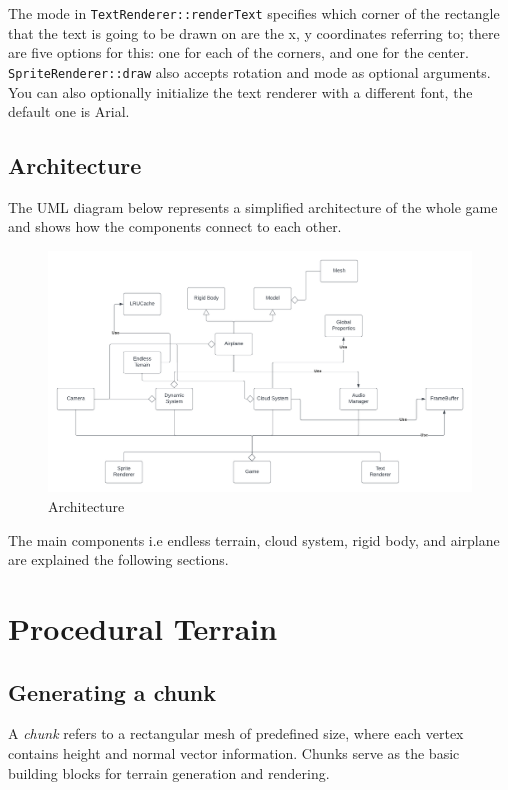 The mode in \texttt{TextRenderer::renderText} specifies which corner of the rectangle that the text is going to be drawn on are the x, y coordinates referring to; there are five options for this: one for each of the corners, and one for the center. \texttt{SpriteRenderer::draw} also accepts rotation and mode as optional arguments. You can also optionally initialize the text renderer with a different font, the default one is Arial.


\subsection{Architecture}

The UML diagram below represents a simplified architecture of the whole game and shows how the components connect to each other.

\begin{figure}[H]
    \centering
    \includegraphics[width=1.0\textwidth]{images/architecture.png}
    \caption{Architecture}
    \label{fig:architecture}
\end{figure}


The main components i.e endless terrain, cloud system, rigid body, and airplane are explained the following sections.

\section{Procedural Terrain}

\subsection{Generating a chunk}

\begin{definition}[Chunk]
A \textit{chunk} refers to a rectangular mesh of predefined size, where each vertex contains height and normal vector information. Chunks serve as the basic building blocks for terrain generation and rendering.
\end{definition}

